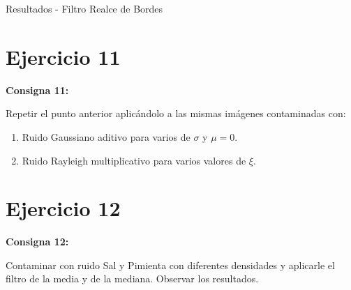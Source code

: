 \documentclass{beamer}
\begin{document}
\begin{frame}[fragile]{Resultados - Filtro Realce de Bordes}
\begin{minipage}{0.45\linewidth}
		\label{fig:lenaej10e}
	\end{minipage}
\end{frame}

\section{Ejercicio 11}

\begin{frame}
	\begin{center}
		\textcolor{unahurverde}{\textbf{Consigna 11:}}
	\end{center}
	\justifying
	
	Repetir el punto anterior aplicándolo a las mismas imágenes contaminadas con:
	
	\begin{enumerate}
		\item Ruido Gaussiano aditivo para varios de $\sigma$ y $\mu = 0$.
		\item Ruido Rayleigh multiplicativo para varios valores de $\xi$. 
	\end{enumerate}
\end{frame}

\section{Ejercicio 12}

\begin{frame}
	\begin{center}
		\textcolor{unahurverde}{\textbf{Consigna 12:}}
	\end{center}
	\justifying
	
	 Contaminar con ruido Sal y Pimienta con diferentes densidades y aplicarle el filtro de la media y de la mediana. Observar los resultados.
\end{frame}
\end{document}
